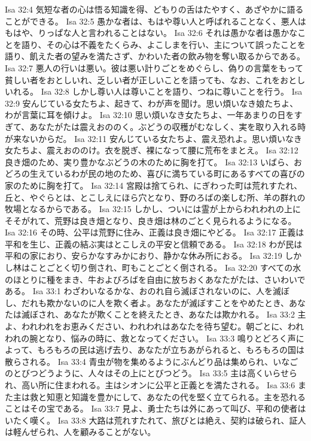 Isa 32:4  気短な者の心は悟る知識を得、どもりの舌はたやすく、あざやかに語ることができる。
Isa 32:5  愚かな者は、もはや尊い人と呼ばれることなく、悪人はもはや、りっぱな人と言われることはない。
Isa 32:6  それは愚かな者は愚かなことを語り、その心は不義をたくらみ、よこしまを行い、主について誤ったことを語り、飢えた者の望みを満たさず、かわいた者の飲み物を奪い取るからである。
Isa 32:7  悪人の行いは悪い。彼は悪い計りごとをめぐらし、偽りの言葉をもって貧しい者をおとしいれ、乏しい者が正しいことを語っても、なお、これをおとしいれる。
Isa 32:8  しかし尊い人は尊いことを語り、つねに尊いことを行う。
Isa 32:9  安んじている女たちよ、起きて、わが声を聞け。思い煩いなき娘たちよ、わが言葉に耳を傾けよ。
Isa 32:10  思い煩いなき女たちよ、一年あまりの日をすぎて、あなたがたは震えおののく。ぶどうの収穫がむなしく、実を取り入れる時が来ないからだ。
Isa 32:11  安んじている女たちよ、震え恐れよ。思い煩いなき女たちよ、震えおののけ。衣を脱ぎ、裸になって腰に荒布をまとえ。
Isa 32:12  良き畑のため、実り豊かなぶどうの木のために胸を打て。
Isa 32:13  いばら、おどろの生えているわが民の地のため、喜びに満ちている町にあるすべての喜びの家のために胸を打て。
Isa 32:14  宮殿は捨てられ、にぎわった町は荒れすたれ、丘と、やぐらとは、とこしえにほら穴となり、野のろばの楽しむ所、羊の群れの牧場となるからである。
Isa 32:15  しかし、ついには霊が上からわれわれの上にそそがれて、荒野は良き畑となり、良き畑は林のごとく見られるようになる。
Isa 32:16  その時、公平は荒野に住み、正義は良き畑にやどる。
Isa 32:17  正義は平和を生じ、正義の結ぶ実はとこしえの平安と信頼である。
Isa 32:18  わが民は平和の家におり、安らかなすみかにおり、静かな休み所におる。
Isa 32:19  しかし林はことごとく切り倒され、町もことごとく倒される。
Isa 32:20  すべての水のほとりに種をまき、牛およびろばを自由に放ちおくあなたがたは、さいわいである。
Isa 33:1  わざわいなるかな、おのれ自ら滅ぼされないのに、人を滅ぼし、だれも欺かないのに人を欺く者よ。あなたが滅ぼすことをやめたとき、あなたは滅ぼされ、あなたが欺くことを終えたとき、あなたは欺かれる。
Isa 33:2  主よ、われわれをお恵みください、われわれはあなたを待ち望む。朝ごとに、われわれの腕となり、悩みの時に、救となってください。
Isa 33:3  鳴りとどろく声によって、もろもろの民は逃げ去り、あなたが立ちあがられると、もろもろの国は散らされる。
Isa 33:4  青虫が物を集めるようにぶんどり品は集められ、いなごのとびつどうように、人々はその上にとびつどう。
Isa 33:5  主は高くいらせられ、高い所に住まわれる。主はシオンに公平と正義とを満たされる。
Isa 33:6  また主は救と知恵と知識を豊かにして、あなたの代を堅く立てられる。主を恐れることはその宝である。
Isa 33:7  見よ、勇士たちは外にあって叫び、平和の使者はいたく嘆く。
Isa 33:8  大路は荒れすたれて、旅びとは絶え、契約は破られ、証人は軽んぜられ、人を顧みることがない。
